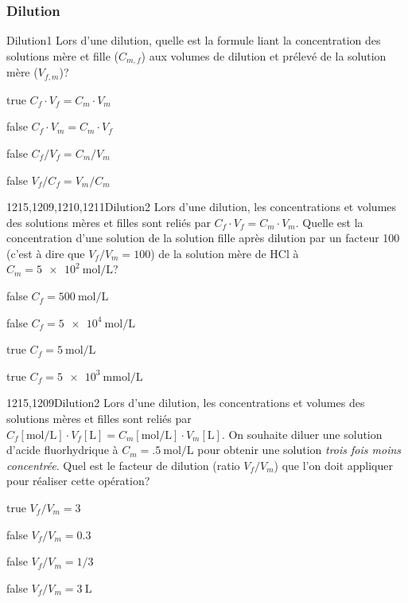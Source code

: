 		\subsubsection{Dilution}
			\begin{question}{}{Dilution}{1}{}
				Lors d'une dilution, quelle est la formule liant la concentration des solutions mère et fille ($C_{m,f}$) aux volumes de dilution et prélevé de la solution mère ($V_{f,m}$)?
			\end{question}
			\begin{reponses}
				\item[true] $C_f\cdot V_f = C_m\cdot V_m$
				\item[false] $C_f\cdot V_m = C_m\cdot V_f$
				\item[false] $C_f/V_f = C_m/V_m$
				\item[false] $V_f/C_f = V_m/C_m$
			\end{reponses}
			\begin{question}{1215,1209,1210,1211}{Dilution}{2}{}
				Lors d'une dilution, les concentrations et volumes des solutions mères et filles sont reliés par $C_f\cdot V_f = C_m\cdot V_m$. Quelle est la concentration d'une solution de la solution fille après dilution par un facteur 100 (c'est à dire que $V_f/V_m = 100$) de la solution mère de HCl à $C_m = \SI{5e2}{\mole\per\liter}$?
			\end{question}
			\begin{reponses}
				\item[false] $C_f = \SI{500}{\mole\per\liter}$
				\item[false] $C_f = \SI{5e4}{\mole\per\liter}$
				\item[true] $C_f = \SI{5}{\mole\per\liter}$
				\item[true] $C_f = \SI{5e3}{\milli\mole\per\liter}$
			\end{reponses}
			\begin{question}{1215,1209}{Dilution}{2}{}
				Lors d'une dilution, les concentrations et volumes des solutions mères et filles sont reliés par $C_f[\si{\mole\per\liter}]\cdot V_f[\si{\liter}] = C_m[\si{\mole\per\liter}]\cdot V_m[\si{\liter}]$. On souhaite diluer une solution d'acide fluorhydrique à $C_m = \SI{.5}{\mole\per\liter}$ pour obtenir une solution \emph{trois fois moins concentrée}. Quel est le facteur de dilution (ratio $V_f/V_m$) que l'on doit appliquer pour réaliser cette opération?
			\end{question}
			\begin{reponses}
				\item[true] $V_f/V_m = \num{3}$
				\item[false] $V_f/V_m = \num{0.3}$
				\item[false] $V_f/V_m = 1/3$
				\item[false] $V_f/V_m = \SI{3}{\liter}$
			\end{reponses}
